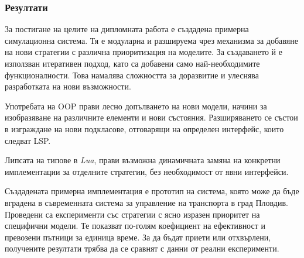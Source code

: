 \subsubsection{Резултати}

		За постигане на целите на дипломната работа е създадена примерна симулационна система. Тя е модуларна и разшируема
		чрез механизма за добавяне на нови стратегии с различна приоритизация на моделите. За създаването й е използван
		итеративен подход, като са добавени само най-необходимите функционалности. Това намалява сложността за доразвитие
		и улеснява разработката на нови възможности. 
		
		Употребата на \ac{OOP} прави лесно допълването на нови модели, начини за изобразяване на различните елементи и нови състояния.
		Разширяването се състои в изграждане на нови подкласове, отговарящи на определен интерфейс, които следват \ac{LSP}.
		
		Липсата на типове в \emph{Lua}, прави възможна динамичната замяна на конкретни имплементации за отделните стратегии, без
		необходимост от явни интерфейси.
		
		Създадената примерна имплементация е прототип на система, която може да бъде вградена
		в съвременната система за управление на транспорта в град Пловдив. Проведени са експерименти със стратегии 
		с ясно изразен приоритет на специфични модели. Те показват по-голям коефициент на ефективност и превозени пътници за единица време.
		За да бъдат приети или отхвърлени, получените резултати трябва да се сравнят с данни от реални експерименти.